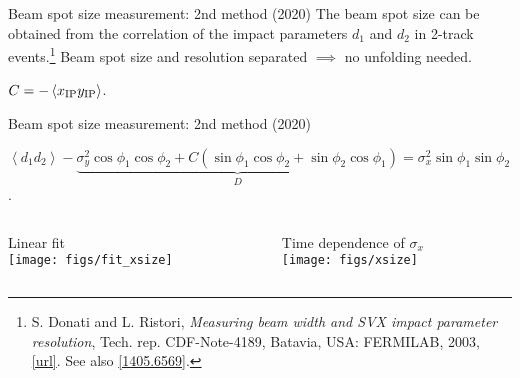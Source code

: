 \begin{frame}{Beam spot size measurement: 2nd method (2020)}
\bi
\itemi The beam spot size can be obtained from the correlation of the impact parameters $d_1$ and $d_2$ in 2-track events.\footnote{\tiny S. Donati and L. Ristori, \emph{Measuring beam width and SVX impact parameter resolution}, Tech. rep. CDF-Note-4189, Batavia, USA: FERMILAB, 2003, \href {http://beamdocs.fnal.gov/AD-public/DocDB/ShowDocument?docid=609}{\color{blue!40!gray} [url]}. See also \href{https://arxiv.org/pdf/1405.6569.pdf}{ \color{blue!40!gray} [1405.6569]}.}
\bi
\itemiii Beam spot size and resolution separated $\implies$ no unfolding needed.
\ei
{}
\bi
\item {\vspace{-0.1cm}$C=-\left\langle x_{\rm IP}y_{\rm IP} \right\rangle$.}
\ei
\ei
\end{frame}
\begin{frame}{Beam spot size measurement: 2nd method (2020)}
\bi
\item {\small $\left\langle d_1d_2 \right\rangle-\underbrace{\sigma_y^2\cos\phi_1\cos\phi_2+C(\sin\phi_1\cos\phi_2+\sin\phi_2\cos\phi_1)}_{D}=\sigma_x^2\sin\phi_1\sin\phi_2$.}
\vspace{0.5cm}
\ei
\begin{columns}
\begin{column}{0.3\linewidth}
\centering
Linear fit\\
\vspace{0.5cm}
\texttt{[image: figs/fit\_xsize]} 
\end{column}
\begin{column}{0.7\linewidth}
\centering
Time dependence of $\sigma_x$\\
\vspace{0.5cm} 
\texttt{[image: figs/xsize]} 
\end{column}
\end{columns}
\end{frame}
